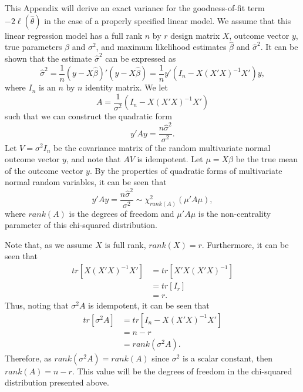\documentclass[12pt]{article} %
\theoremstyle{definition}
\begin{document}
This Appendix will derive an exact variance for the goodness-of-fit term $-2 \ell (\hat{\theta} )$ in the case of a properly specified
linear model. We assume that this linear regression model has a full rank $n$ by $r$ design matrix $X$, outcome vector $y$, true parameters $\beta$ and $\sigma^2$,
and maximum likelihood estimates $\hat{\beta}$ and $\hat{\sigma}^2$. It can be shown that the estimate $\hat{\sigma}^2$ can be expressed as
\begin{equation*}
	\hat{\sigma}^2 =  \frac{1}{n} (y-X\hat{\beta})'(y-X\hat{\beta}) = \frac{1}{n} y'(I_n - X(X'X)^{-1}X')y ,
\end{equation*}
where $I_n$ is an $n$ by $n$ identity matrix. We let
\begin{equation*}
	A = \frac{1}{\sigma^2} (I_n - X(X'X)^{-1}X') 
\end{equation*}
such that we can construct the quadratic form
\begin{equation*}
	y'Ay = \frac{n \hat{\sigma}^2}{\sigma^2} .
\end{equation*}
Let $V = \sigma^2 I_n$ be the covariance matrix of the random multivariate normal outcome vector $y$, and note that $AV$ is idempotent. Let $\mu = X \beta$ be the
true mean of the outcome vector $y$. By the properties of quadratic forms of multivariate normal random variables, it can be seen that
\begin{equation*}
	y'Ay = \frac{n \hat{\sigma}^2}{\sigma^2} \sim \chi^2_{rank \left( A \right) } (\mu 'A\mu) ,
\end{equation*}
where $rank \left( A \right)$ is the degrees of freedom and $\mu 'A \mu$ is the non-centrality parameter of this chi-squared distribution.

Note that, as we assume $X$ is full rank, $rank(X) = r$. Furthermore, it can be seen that
\begin{equation*}
	\begin{split}
	tr\left[ X(X'X)^{-1}X' \right] & = tr \left[ X'X(X'X)^{-1} \right]  \\ 
	& = tr \left[ I_r \right] \\
	& = r .
	\end{split}
\end{equation*}
Thus, noting that $\sigma^2 A$ is idempotent, it can be seen that
\begin{equation*}
	\begin{split}
	tr \left[ \sigma^2 A \right] & = tr \left[ I_n - X(X'X)^{-1}X' \right]  \\ 
	& = n-r \\
	& = rank \left( \sigma^2 A \right) .
	\end{split}
\end{equation*}
Therefore, as $rank \left( \sigma^2 A \right) = rank \left( A \right)$ since $\sigma^2$ is a scalar constant, then $rank \left( A \right) = n-r$. This value will be the degrees of
freedom in the chi-squared distribution presented above.
\end{document}
